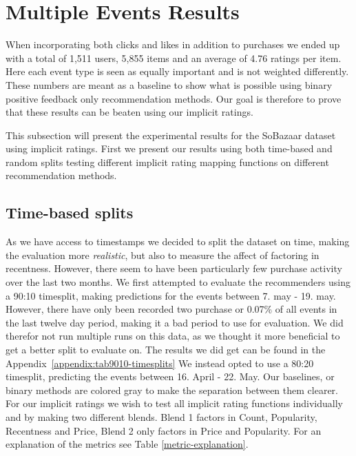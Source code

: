 \section{Multiple Events Results}

When incorporating both clicks and likes in addition to purchases we ended up with a total of 1,511 users, 5,855 items
and an average of 4.76 ratings per item. Here each event type is seen as equally important and is not weighted differently.
These numbers are meant as a baseline to show what is possible using binary positive feedback only recommendation methods.
Our goal is therefore to prove that these results can be beaten using our implicit ratings.

This subsection will present the experimental results for the SoBazaar dataset using implicit ratings. First we present
our results using both time-based and random splits testing different implicit rating mapping functions on different recommendation methods.

\subsection{Time-based splits}

As we have access to timestamps we decided to split the dataset on time, making the evaluation more \textit{realistic}, but also to measure the
affect of factoring in recentness. However, there seem to have been particularly few purchase activity over the last two months. We first attempted to evaluate the recommenders
using a 90:10 timesplit, making predictions for the events between 7. may - 19. may. However, there have only been recorded two purchase or 0.07\% of
all events in the last twelve day period, making it a bad period to use for evaluation. We did therefor not run multiple runs on this
data, as we thought it more beneficial to get a better split to evaluate on. The results we did get can be found in the Appendix~\ref{appendix:tab9010-timesplits}
We instead opted to use a 80:20 timesplit, predicting the events between 16. April - 22. May. Our baselines, or binary methods are colored gray to
make the separation between them clearer. For our implicit ratings we wish to test all implicit rating functions individually and by making two different blends.
Blend 1 factors in Count, Popularity, Recentness and Price, Blend 2 only factors in Price and Popularity. For an explanation of the metrics see Table \ref{metric-explanation}.

